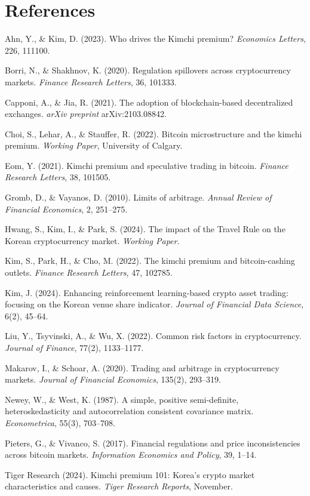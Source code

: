 \documentclass[11pt,a4paper]{article}
\begin{document}
\section*{References}
\begin{description}\itemsep4pt
\item[{[1]}] Ahn, Y., \& Kim, D. (2023). Who drives the Kimchi premium?
\emph{Economics Letters}, 226, 111100.
\item[{[2]}] Borri, N., \& Shakhnov, K. (2020). Regulation spillovers across cryptocurrency markets.
\emph{Finance Research Letters}, 36, 101333.
\item[{[3]}] Capponi, A., \& Jia, R. (2021). The adoption of blockchain-based decentralized exchanges.
\emph{arXiv preprint} arXiv:2103.08842.
\item[{[4]}] Choi, S., Lehar, A., \& Stauffer, R. (2022). Bitcoin microstructure and the kimchi premium.
\emph{Working Paper}, University of Calgary.
\item[{[5]}] Eom, Y. (2021). Kimchi premium and speculative trading in bitcoin.
\emph{Finance Research Letters}, 38, 101505.
\item[{[6]}] Gromb, D., \& Vayanos, D. (2010). Limits of arbitrage.
\emph{Annual Review of Financial Economics}, 2, 251--275.
\item[{[7]}] Hwang, S., Kim, I., \& Park, S. (2024). The impact of the Travel Rule on the Korean cryptocurrency market.
\emph{Working Paper}.
\item[{[8]}] Kim, S., Park, H., \& Cho, M. (2022). The kimchi premium and bitcoin-cashing outlets.
\emph{Finance Research Letters}, 47, 102785.
\item[{[9]}] Kim, J. (2024). Enhancing reinforcement learning-based crypto asset trading: focusing on the Korean venue share indicator.
\emph{Journal of Financial Data Science}, 6(2), 45--64.
\item[{[10]}] Liu, Y., Tsyvinski, A., \& Wu, X. (2022). Common risk factors in cryptocurrency.
\emph{Journal of Finance}, 77(2), 1133--1177.
\item[{[11]}] Makarov, I., \& Schoar, A. (2020). Trading and arbitrage in cryptocurrency markets.
\emph{Journal of Financial Economics}, 135(2), 293--319.
\item[{[12]}] Newey, W., \& West, K. (1987). A simple, positive semi-definite, heteroskedasticity and autocorrelation consistent covariance matrix.
\emph{Econometrica}, 55(3), 703--708.
\item[{[13]}] Pieters, G., \& Vivanco, S. (2017). Financial regulations and price inconsistencies across bitcoin markets.
\emph{Information Economics and Policy}, 39, 1--14.
\item[{[14]}] Tiger Research (2024). Kimchi premium 101: Korea's crypto market characteristics and causes.
\emph{Tiger Research Reports}, November.
\end{description}
\end{document}
